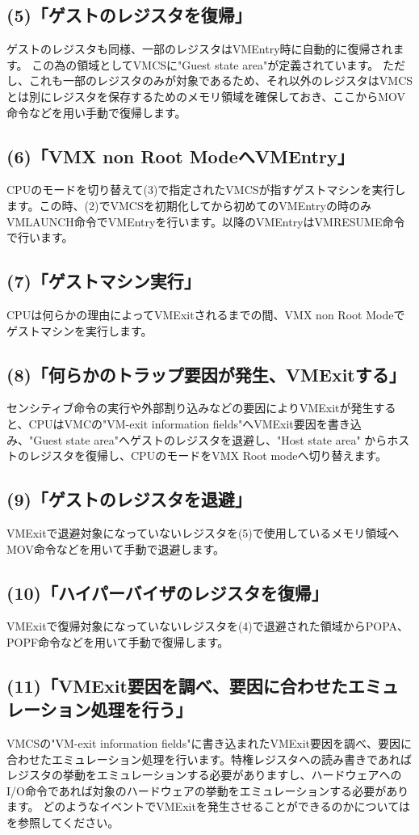 \subsection*{(5)「ゲストのレジスタを復帰」}
ゲストのレジスタも同様、一部のレジスタはVMEntry時に自動的に復帰されます。
この為の領域としてVMCSに"Guest state area"が定義されています。
ただし、これも一部のレジスタのみが対象であるため、それ以外のレジスタはVMCSとは別にレジスタを保存するためのメモリ領域を確保しておき、ここからMOV命令などを用い手動で復帰します。

\subsection*{(6)「VMX non Root ModeへVMEntry」}
CPUのモードを切り替えて(3)で指定されたVMCSが指すゲストマシンを実行します。この時、(2)でVMCSを初期化してから初めてのVMEntryの時のみVMLAUNCH命令でVMEntryを行います。以降のVMEntryはVMRESUME命令で行います。

\subsection*{(7)「ゲストマシン実行」}
CPUは何らかの理由によってVMExitされるまでの間、VMX non Root Modeでゲストマシンを実行します。

\subsection*{(8)「何らかのトラップ要因が発生、VMExitする」}
センシティブ命令の実行や外部割り込みなどの要因によりVMExitが発生すると、CPUはVMCの"VM-exit information fields"へVMExit要因を書き込み、"Guest state area"へゲストのレジスタを退避し、"Host state area" からホストのレジスタを復帰し、CPUのモードをVMX Root modeへ切り替えます。

\subsection*{(9)「ゲストのレジスタを退避」}
VMExitで退避対象になっていないレジスタを(5)で使用しているメモリ領域へMOV命令などを用いて手動で退避します。

\subsection*{(10)「ハイパーバイザのレジスタを復帰」}
VMExitで復帰対象になっていないレジスタを(4)で退避された領域からPOPA、POPF命令などを用いて手動で復帰します。

\subsection*{(11)「VMExit要因を調べ、要因に合わせたエミュレーション処理を行う」}
VMCSの"VM-exit information fields"に書き込まれたVMExit要因を調べ、要因に合わせたエミュレーション処理を行います。特権レジスタへの読み書きであればレジスタの挙動をエミュレーションする必要がありますし、ハードウェアへのI/O命令であれば対象のハードウェアの挙動をエミュレーションする必要があります。
どのようなイベントでVMExitを発生させることができるのかについては\cite{SDM}を参照してください。

